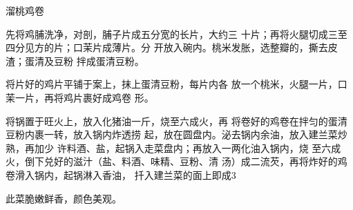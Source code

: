 \begin{recipe}{溜桃鸡卷}

\ingredients





\cooking

先将鸡脯洗净，对剖，脯子片成五分宽的长片，大约三 十片；再将火腿切成三至四分见方的片；口茉片成薄片。分 开放入碗内。桃米发胀，选整瓣的，撕去皮渣；蛋清及豆粉 拌成蛋清豆粉。

\step 	将片好的鸡片平铺于案上，抹上蛋清豆粉，每片内各 放一个桃米，火腿一片，口茉一片，再将鸡片裹好成鸡卷 形。

\step 	将锅置于旺火上，放入化猪油一斤，烧至六成火，再 将卷好的鸡卷在拌匀的蛋清豆粉内裹一转，放入锅内炸透捞 起，放在圆盘内。泌去锅内余油，放入建兰菜炒熟，再加少 许料酒、盐，起锅入走菜盘内；再放入一两化油入锅内，烧 至六成火，倒下兑好的滋汁（盐、料酒、味精、豆粉、清 汤）成二流芡，再将炸好的鸡卷滑入锅内，起锅淋入香油， 扦入建兰菜的面上即成3

\notes

此菜脆嫩鲜香，颜色美观。

\end{recipe}


